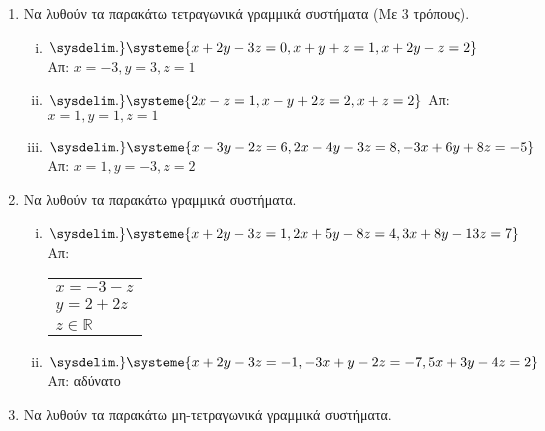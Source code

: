 \documentclass[a4paper,table]{report}
\begin{document}
\begin{center}
  \minibox{\large \bfseries \textcolor{Col1}{Ασκήσεις στα Γραμμικά Συστήματα}}
\end{center}

\vspace{\baselineskip}


\begin{enumerate}
  \item Να λυθούν τα παρακάτω τετραγωνικά γραμμικά συστήματα (Με 3 τρόπους).

    \begin{enumerate}[i)]
      \item $ 
      \sysdelim.\}
      \systeme{x + 2y - 3z = 0,
        x + y + z =1,
      x + 2y - z = 2} $ 
      \hfill Απ: $ x=-3, y=3, z=1 $ 

    \item $ 
    \sysdelim.\}
    \systeme{2x-z=1,x-y+2z=2,x+z=2} $ 
    \hfill Απ: $ x=1, y=1, z=1 $ 

  \item $ 
  \sysdelim.\}
  \systeme{
    x-3y-2z=6,
    2x-4y-3z=8,
    -3x+6y+8z=-5
  } $ 
  \hfill Απ: $ x=1, y=-3, z=2 $ 

\end{enumerate}

\item Να λυθούν τα παρακάτω γραμμικά συστήματα.

  \begin{enumerate}[i)]
    \item $ 
    \sysdelim.\}
    \systeme{
      x+2y-3z=1,
      2x+5y-8z=4,
      3x+8y-13z=7
    } $ 
    \hfill Απ: \begin{tabular}{l}  
      $x=-3-z $ \\ 
      $ y=2+2z $ \\
      $z \in \mathbb{R}  $
    \end{tabular}

  \item $ 
  \sysdelim.\}
  \systeme{
    x+2y-3z=-1,
    -3x+y-2z=-7,
    5x+3y-4z=2
  } $ 
  \hfill Απ: αδύνατο 
\end{enumerate}

\item Να λυθούν τα παρακάτω μη-τετραγωνικά γραμμικά συστήματα.

  \begin{enumerate}[i)]


\end{enumerate}
\end{enumerate}
\end{document}
